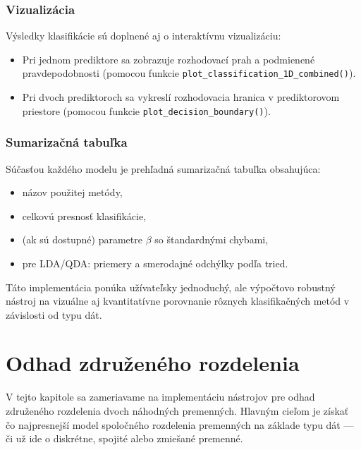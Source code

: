 \subsubsection{Vizualizácia}

Výsledky klasifikácie sú doplnené aj o interaktívnu vizualizáciu:

\begin{itemize}
\setlength{\itemsep}{0pt}
  \setlength{\parskip}{0pt}
  \item Pri jednom prediktore sa zobrazuje rozhodovací prah a podmienené pravdepodobnosti (pomocou funkcie \texttt{plot\_classification\_1D\_combined()}).
  \item Pri dvoch prediktoroch sa vykreslí rozhodovacia hranica v prediktorovom priestore (pomocou funkcie \texttt{plot\_decision\_boundary()}).
\end{itemize}

\subsubsection{Sumarizačná tabuľka}

Súčasťou každého modelu je prehľadná sumarizačná tabuľka obsahujúca:

\begin{itemize}
\setlength{\itemsep}{0pt}
  \setlength{\parskip}{0pt}
  \item názov použitej metódy,
  \item celkovú presnosť klasifikácie,
  \item (ak sú dostupné) parametre $\beta$ so štandardnými chybami,
  \item pre LDA/QDA: priemery a smerodajné odchýlky podľa tried.
\end{itemize}

Táto implementácia ponúka užívateľsky jednoduchý, ale výpočtovo robustný nástroj na vizuálne aj kvantitatívne porovnanie rôznych klasifikačných metód v závislosti od typu dát.


\section{Odhad združeného rozdelenia}\label{sec:joint_dist_estimation}

V tejto kapitole sa zameriavame na implementáciu nástrojov pre odhad združeného rozdelenia dvoch náhodných premenných. Hlavným cieľom je získať čo najpresnejší model spoločného rozdelenia premenných na základe typu dát — či už ide o diskrétne, spojité alebo zmiešané premenné.

